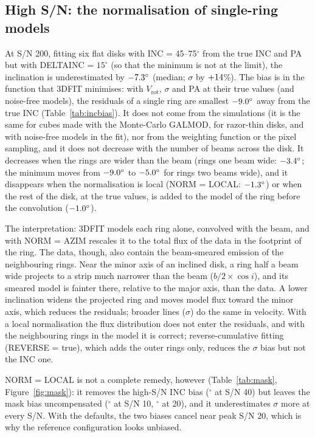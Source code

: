 \documentclass[10pt,a4paper]{article}
\newcommand{\vrot}{V_\mathrm{rot}}
\begin{document}
\subsection{High S/N: the normalisation of single-ring models}\label{sec:azim}
At S/N 200, fitting six flat disks with INC = 45--75$^\circ$ from the true INC and PA but with DELTAINC =
$15^\circ$ (so that the minimum is not at the limit), the inclination is underestimated by
$-7.3^\circ$ (median; $\sigma$ by $+14$\%). The bias is in the function that 3DFIT
minimises: with $\vrot$, $\sigma$ and PA at their true values (and noise-free models), the residuals of a
single ring are smallest $-9.0^\circ$ away from the true INC (Table~\ref{tab:incbias}). It does not come from the
simulations (it is the same for cubes made with the Monte-Carlo GALMOD, for razor-thin disks, and with
noise-free models in the fit), nor from the weighting function or the pixel sampling, and it does not
decrease with the number of beams across the disk. It decreases when the rings are wider than the beam
(rings one beam wide: $-3.4^\circ$; the minimum moves from $-9.0^\circ$ to $-5.0^\circ$ for
rings two beams wide), and it disappears when the normalisation is local (NORM = LOCAL:
$-1.3^\circ$) or when the rest of the disk, at the true values, is added to the model of the ring
before the convolution ($-1.0^\circ$).

The interpretation: 3DFIT models each ring alone, convolved with the beam, and with NORM = AZIM rescales
it to the total flux of the data in the footprint of the ring. The data, though, also contain the
beam-smeared emission of the neighbouring rings. Near the minor axis of an inclined disk, a ring half a
beam wide projects to a strip much narrower than the beam ($b/2 \times \cos i$), and its smeared model is
fainter there, relative to the major axis, than the data. A lower inclination widens the projected ring
and moves model flux toward the minor axis, which reduces the residuals; broader lines ($\sigma$) do the
same in velocity. With a local normalisation the flux distribution does not enter the residuals, and
with the neighbouring rings in the model it is correct; reverse-cumulative fitting
(REVERSE = true), which adds the outer rings only, reduces the $\sigma$ bias but not the INC one.

NORM = LOCAL is not a complete remedy, however (Table~\ref{tab:mask}, Figure~\ref{fig:mask}): it removes
the high-S/N INC bias (\MaskLocalFortyInc$^\circ$ at S/N 40) but leaves the mask bias uncompensated
(\MaskLocalTenInc$^\circ$ at S/N 10, \MaskLocalTwentyInc$^\circ$ at 20), and it underestimates $\sigma$
more at every S/N. With the defaults, the two biases cancel near peak S/N 20, which is why the reference
configuration looks unbiased.
\end{document}
